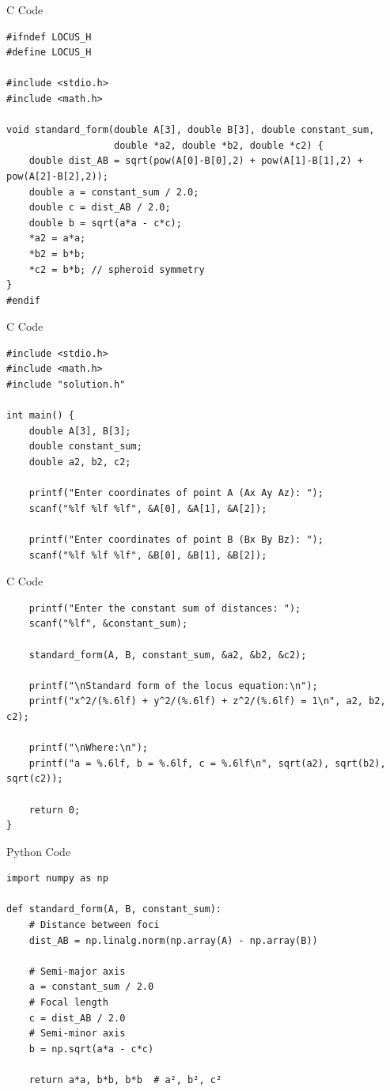\documentclass{beamer}
\begin{document}
\begin{frame}[fragile]{C Code}
    \begin{verbatim}
#ifndef LOCUS_H
#define LOCUS_H

#include <stdio.h>
#include <math.h>

void standard_form(double A[3], double B[3], double constant_sum,
                   double *a2, double *b2, double *c2) {
    double dist_AB = sqrt(pow(A[0]-B[0],2) + pow(A[1]-B[1],2) + pow(A[2]-B[2],2));
    double a = constant_sum / 2.0;
    double c = dist_AB / 2.0;
    double b = sqrt(a*a - c*c);
    *a2 = a*a;
    *b2 = b*b;
    *c2 = b*b; // spheroid symmetry
}
#endif
    \end{verbatim}
\end{frame}

\begin{frame}[fragile]{C Code}
    \begin{verbatim}
#include <stdio.h>
#include <math.h>
#include "solution.h"

int main() {
    double A[3], B[3];
    double constant_sum;
    double a2, b2, c2;

    printf("Enter coordinates of point A (Ax Ay Az): ");
    scanf("%lf %lf %lf", &A[0], &A[1], &A[2]);

    printf("Enter coordinates of point B (Bx By Bz): ");
    scanf("%lf %lf %lf", &B[0], &B[1], &B[2]);
    \end{verbatim}
\end{frame}

\begin{frame}[fragile]{C Code}
    \begin{verbatim}
    printf("Enter the constant sum of distances: ");
    scanf("%lf", &constant_sum);

    standard_form(A, B, constant_sum, &a2, &b2, &c2);

    printf("\nStandard form of the locus equation:\n");
    printf("x^2/(%.6lf) + y^2/(%.6lf) + z^2/(%.6lf) = 1\n", a2, b2, c2);

    printf("\nWhere:\n");
    printf("a = %.6lf, b = %.6lf, c = %.6lf\n", sqrt(a2), sqrt(b2), sqrt(c2));

    return 0;
}
    \end{verbatim}
\end{frame}

\begin{frame}[fragile]{Python Code}
    \begin{verbatim}
import numpy as np

def standard_form(A, B, constant_sum):
    # Distance between foci
    dist_AB = np.linalg.norm(np.array(A) - np.array(B))
    
    # Semi-major axis
    a = constant_sum / 2.0
    # Focal length
    c = dist_AB / 2.0
    # Semi-minor axis
    b = np.sqrt(a*a - c*c)

    return a*a, b*b, b*b  # a², b², c²
    \end{verbatim}
\end{frame}
\end{document}
